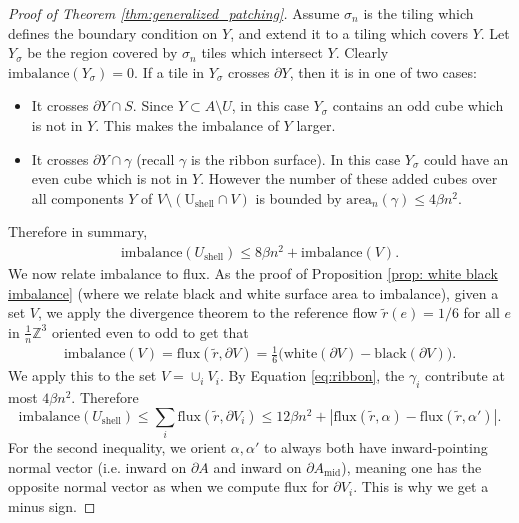 \documentclass[11pt]{article}
\theoremstyle{remark}
\theoremstyle{definition}
\newcommand{\m}[1]{\mathbb{#1}}
\begin{document}
\begin{proof}[Proof of Theorem \ref{thm:generalized_patching}]
    Assume $\sigma_n$ is the tiling which defines the boundary condition on $Y$, and extend it to a tiling which covers $Y$. Let $Y_\sigma$ be the region covered by $\sigma_n$ tiles which intersect $Y$. Clearly $\text{imbalance}(Y_\sigma) = 0$. If a tile in $Y_\sigma$ crosses $\partial Y$, then it is in one of two cases: 
    \begin{itemize}
        \item It crosses $\partial Y \cap S$. Since $Y\subset A\setminus U$, in this case $Y_\sigma$ contains an odd cube which is not in $Y$. This makes the imbalance of $Y$ larger. 
        \item It crosses $\partial Y \cap \gamma$ (recall $\gamma$ is the ribbon surface). In this case $Y_\sigma$ could have an even cube which is not in $Y$. However the number of these added cubes over all components $Y$ of $V\setminus (\text{U}_{\text{shell}}\cap V)$ is bounded by $\text{area}_n(\gamma) \leq 4\beta n^2$.
    \end{itemize}
    Therefore in summary,
    \begin{align*}
        \text{imbalance}(U_\text{shell}) \leq 8\beta n^2 + \text{imbalance}(V).
    \end{align*}
    We now relate imbalance to flux. As the proof of Proposition \ref{prop: white black imbalance} (where we relate black and white surface area to imbalance), given a set $V$, we apply the divergence theorem to the reference flow $\widetilde r(e) =1/6$ for all $e$ in $\frac{1}{n}\m Z^3$ oriented even to odd to get that 
    \begin{align*}
        \text{imbalance}(V) = \text{flux}(\widetilde r, \partial V) = \frac{1}{6}\bigg(\text{white}(\partial V)-\text{black}(\partial V)\bigg).
    \end{align*}
    We apply this to the set $V=\cup_i V_i$. By Equation \eqref{eq:ribbon}, the $\gamma_i$ contribute at most $4\beta n^2$. Therefore 
    \begin{equation}\label{eq:imbalance_as_flux_r}
        \text{imbalance}(U_\text{shell})  \leq \sum_i \text{flux}(\widetilde r, \partial V_i) \leq 12\beta n^2 + |\text{flux}(\widetilde r,\alpha) - \text{flux}(\widetilde r,\alpha')| .
    \end{equation}
    For the second inequality, we orient $\alpha,\alpha'$ to always both have inward-pointing normal vector (i.e. inward on $\partial A$ and inward on $\partial A_{\text{mid}}$), meaning one has the opposite normal vector as when we compute flux for $\partial V_i$. This is why we get a minus sign.     
    

\end{proof}
\end{document}
